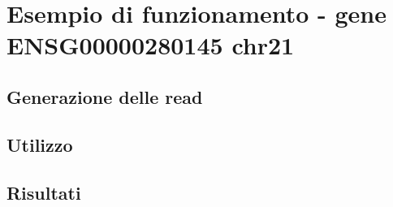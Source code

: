 \section{Esempio di funzionamento - gene ENSG00000280145 chr21}

\subsection{Generazione delle read}

\newpage

\subsection{Utilizzo}

\newpage

\subsection{Risultati}

\newpage